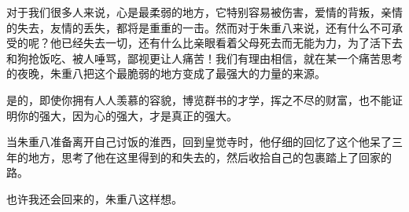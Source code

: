 \begin{multicols}{\theparacolNo}
		对于我们很多人来说，心是最柔弱的地方，它特别容易被伤害，爱情的背叛，亲情的失去，友情的丢失，都将是重重的一击。然而对于朱重八来说，还有什么不可承受的呢？他已经失去一切，还有什么比亲眼看着父母死去而无能为力，为了活下去和狗抢饭吃、被人唾骂，鄙视更让人痛苦！我们有理由相信，就在某一个痛苦思考的夜晚，朱重八把这个最脆弱的地方变成了最强大的力量的来源。

		是的，即使你拥有人人羡慕的容貌，博览群书的才学，挥之不尽的财富，也不能证明你的强大，因为心的强大，才是真正的强大。

		当朱重八准备离开自己讨饭的淮西，回到皇觉寺时，他仔细的回忆了这个他呆了三年的地方，思考了他在这里得到的和失去的，然后收拾自己的包裹踏上了回家的路。

		也许我还会回来的，朱重八这样想。
		\ifnum{}
	\end{multicols}
\fi
\newpage
